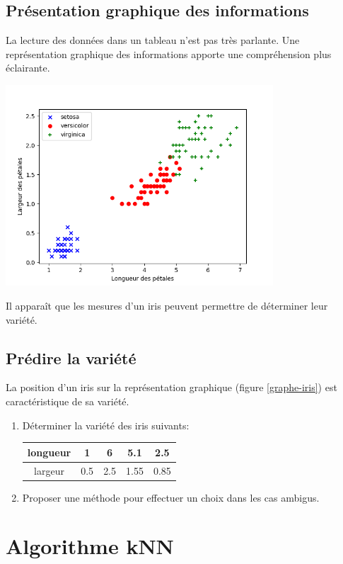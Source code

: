 \documentclass[a4paper,11pt]{article}
\begin{document}
\subsection{Présentation graphique des informations}
La lecture des données dans un tableau n'est pas très parlante. Une représentation graphique des informations apporte une compréhension plus éclairante.
\begin{center}
\centering
\includegraphics[width=10cm]{ressources/iris-graphe.png}
\label{graphe-iris}
\end{center}
Il apparaît que les mesures d'un iris peuvent permettre de déterminer leur variété.
\subsection{Prédire la variété}
La position d'un iris sur la représentation graphique (figure \ref{graphe-iris}) est caractéristique de sa variété.
\begin{activite}
\begin{enumerate}
    \item Déterminer la variété des iris suivants:
    \begin{tabular}{|*{5}{c|}}
        \hline
        longueur&1&6 &5.1 &2.5 \\
        \hline
        largeur&0.5&2.5& 1.55&0.85 \\
        \hline
    \end{tabular}
    \item Proposer une méthode pour effectuer un choix dans les cas ambigus.
\end{enumerate}
\end{activite}
\section{Algorithme kNN}
\end{document}
